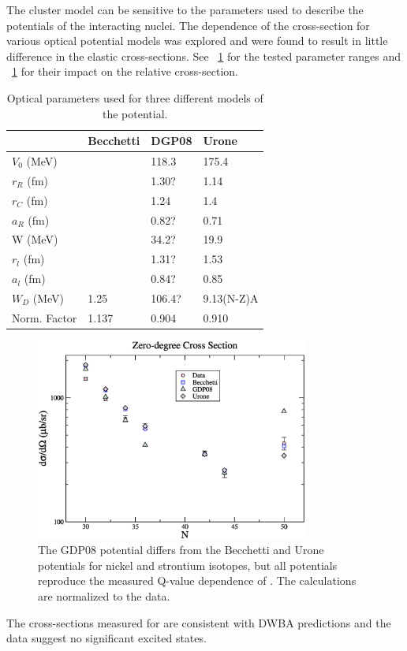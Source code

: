 The cluster model can be sensitive to the parameters used to describe the potentials of the interacting nuclei.  The dependence of the cross-section for various  optical potential models was explored and were found to result in little difference in the elastic cross-sections.  See {\tab}~\ref{tab:parameterSensitivity} for the tested parameter ranges and {\fig}~\ref{fig:parameterSensitivity} for their impact on the relative cross-section.
\begin{table}[htp]
\centering
\begin{tabular}{llll}
 & Becchetti & DGP08 & Urone \\
\hline
$V_0$ (MeV) & & 118.3 & 175.4 \\
$r_R$ (fm) & & 1.30? & 1.14 \\
$r_C$ (fm) & & 1.24 & 1.4 \\
$a_R$ (fm) & & 0.82? & 0.71 \\
W (MeV) & & 34.2? & 19.9 \\
$r_l$ (fm) & & 1.31? & 1.53 \\
$a_l$ (fm) & & 0.84? & 0.85 \\
$W_D$ (MeV) & 1.25 & 106.4? & 9.13(N-Z)A \\
Norm. Factor & 1.137 & 0.904 & 0.910 \\
\end{tabular}
\caption{Optical parameters used for three different models of the  potential.}
\label{tab:parameterSensitivity}
\end{table}

\begin{figure}[!htbp]
\centering
\includegraphics[width=0.8\textwidth]{figures/CrossSectionVsN_ElasticSurvey.eps}
\caption{The GDP08 potential differs from the Becchetti and Urone potentials for nickel and strontium isotopes, but all potentials reproduce the measured Q-value dependence of \GeTargets.  The calculations are normalized to the  data.}
\label{fig:parameterSensitivity}
\end{figure}

The cross-sections measured for \reaction are consistent with DWBA predictions and the data suggest no significant excited \zp states.
%
% 
% 
